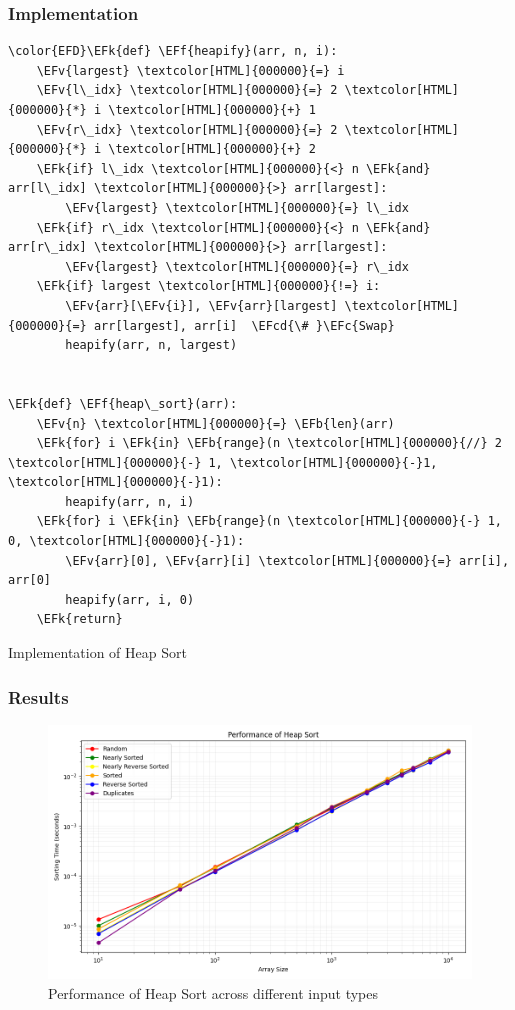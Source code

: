 \documentclass[a4paper,12pt]{article}
\newcommand{\EFc}[1]{\textcolor{EFc}{#1}} %
\newcommand{\EFcd}[1]{\textcolor{EFcd}{#1}} %
\newcommand{\EFk}[1]{\textcolor{EFk}{#1}} %
\newcommand{\EFb}[1]{\textcolor{EFb}{#1}} %
\newcommand{\EFf}[1]{\textcolor{EFf}{#1}} %
\newcommand{\EFv}[1]{\textcolor{EFv}{#1}} %
\begin{document}
\subsubsection{Implementation}
\label{sec:org372ddf9}
\begin{listing}[htbp]
\begin{Code}
\begin{Verbatim}
\color{EFD}\EFk{def} \EFf{heapify}(arr, n, i):
    \EFv{largest} \textcolor[HTML]{000000}{=} i
    \EFv{l\_idx} \textcolor[HTML]{000000}{=} 2 \textcolor[HTML]{000000}{*} i \textcolor[HTML]{000000}{+} 1
    \EFv{r\_idx} \textcolor[HTML]{000000}{=} 2 \textcolor[HTML]{000000}{*} i \textcolor[HTML]{000000}{+} 2
    \EFk{if} l\_idx \textcolor[HTML]{000000}{<} n \EFk{and} arr[l\_idx] \textcolor[HTML]{000000}{>} arr[largest]:
        \EFv{largest} \textcolor[HTML]{000000}{=} l\_idx
    \EFk{if} r\_idx \textcolor[HTML]{000000}{<} n \EFk{and} arr[r\_idx] \textcolor[HTML]{000000}{>} arr[largest]:
        \EFv{largest} \textcolor[HTML]{000000}{=} r\_idx
    \EFk{if} largest \textcolor[HTML]{000000}{!=} i:
        \EFv{arr}[\EFv{i}], \EFv{arr}[largest] \textcolor[HTML]{000000}{=} arr[largest], arr[i]  \EFcd{\# }\EFc{Swap}
        heapify(arr, n, largest)


\EFk{def} \EFf{heap\_sort}(arr):
    \EFv{n} \textcolor[HTML]{000000}{=} \EFb{len}(arr)
    \EFk{for} i \EFk{in} \EFb{range}(n \textcolor[HTML]{000000}{//} 2 \textcolor[HTML]{000000}{-} 1, \textcolor[HTML]{000000}{-}1, \textcolor[HTML]{000000}{-}1):
        heapify(arr, n, i)
    \EFk{for} i \EFk{in} \EFb{range}(n \textcolor[HTML]{000000}{-} 1, 0, \textcolor[HTML]{000000}{-}1):
        \EFv{arr}[0], \EFv{arr}[i] \textcolor[HTML]{000000}{=} arr[i], arr[0]
        heapify(arr, i, 0)
    \EFk{return}
\end{Verbatim}
\end{Code}
\caption{\label{lst:org3d0adf4}Implementation of Heap Sort}
\end{listing}
\subsubsection{Results}
\label{sec:org2a7d763}
\begin{figure}[htbp]
\centering
\includegraphics[width=.9\linewidth]{sorting_performance_heap_sort.png}
\caption{\label{fig:orgb73fac1}Performance of Heap Sort across different input types}
\end{figure}
\end{document}
